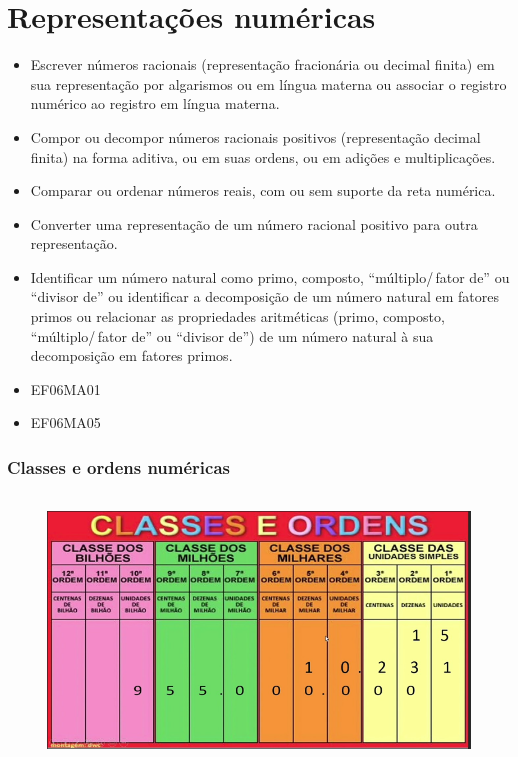 
\chapter{Representações numéricas}



\begin{itemize}
\item
  Escrever números racionais (representação fracionária ou decimal
  finita) em sua representação por algarismos ou em língua materna ou
  associar o registro numérico ao registro em língua materna.
\item
  Compor ou decompor números racionais positivos (representação decimal
  finita) na forma aditiva, ou em suas ordens, ou em adições e
  multiplicações.
\item
  Comparar ou ordenar números reais, com ou sem suporte da reta
  numérica.
\item
  Converter uma representação de um número racional positivo para outra
  representação. 
  \item Identificar um número natural como primo, composto,
  ``múltiplo/\,fator de'' ou ``divisor de'' ou identificar a decomposição
  de um número natural em fatores primos ou relacionar as propriedades
  aritméticas (primo, composto, ``múltiplo/\,fator de'' ou ``divisor de'')
  de um número natural à sua decomposição em fatores primos.
\end{itemize}

\begin{itemize} 
\item EF06MA01
\item EF06MA05
\end{itemize}

\subsection{Classes e ordens numéricas}

\begin{figure}[h]%
\includegraphics[width=5in,height=2.80208in]{./imgSAEB_6_MAT/media/image1.png}
\end{figure}


